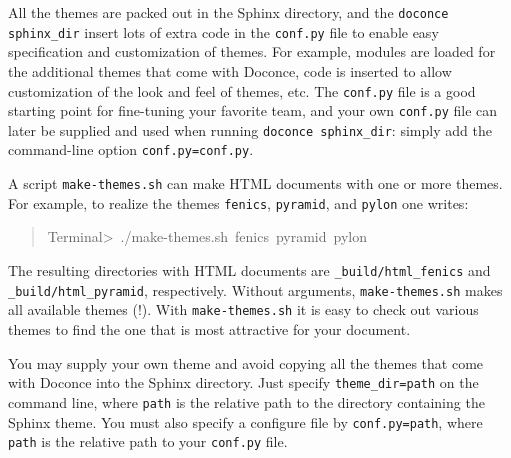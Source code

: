 \documentclass[a4paper]{article}
\begin{document}
All the themes are packed out in the Sphinx directory, and the
\texttt{doconce sphinx\_dir} insert lots of extra code in the \texttt{conf.py}
file to enable easy specification and customization of themes.
For example, modules are loaded for the additional themes that
come with Doconce, code is inserted to allow customization of
the look and feel of themes, etc. The \texttt{conf.py} file is a
good starting point for fine-tuning your favorite team, and your
own \texttt{conf.py} file can later be supplied and used when running
\texttt{doconce sphinx\_dir}: simply add the command-line option
\texttt{conf.py=conf.py}.

A script
\texttt{make-themes.sh} can make HTML documents with one or more themes.
For example,
to realize the themes \texttt{fenics}, \texttt{pyramid}, and \texttt{pylon} one writes:
%
\begin{quote}{\ttfamily \raggedright \noindent
Terminal>~./make-themes.sh~fenics~pyramid~pylon
}
\end{quote}

The resulting directories with HTML documents are \texttt{\_build/html\_fenics}
and \texttt{\_build/html\_pyramid}, respectively. Without arguments,
\texttt{make-themes.sh} makes all available themes (!). With \texttt{make-themes.sh}
it is easy to check out various themes to find the one that is most
attractive for your document.

You may supply your own theme and avoid copying all the themes
that come with Doconce into the Sphinx directory. Just specify
\texttt{theme\_dir=path} on the command line, where \texttt{path} is the relative
path to the directory containing the Sphinx theme. You must also
specify a configure file by \texttt{conf.py=path}, where \texttt{path} is the
relative path to your \texttt{conf.py} file.
\end{document}
